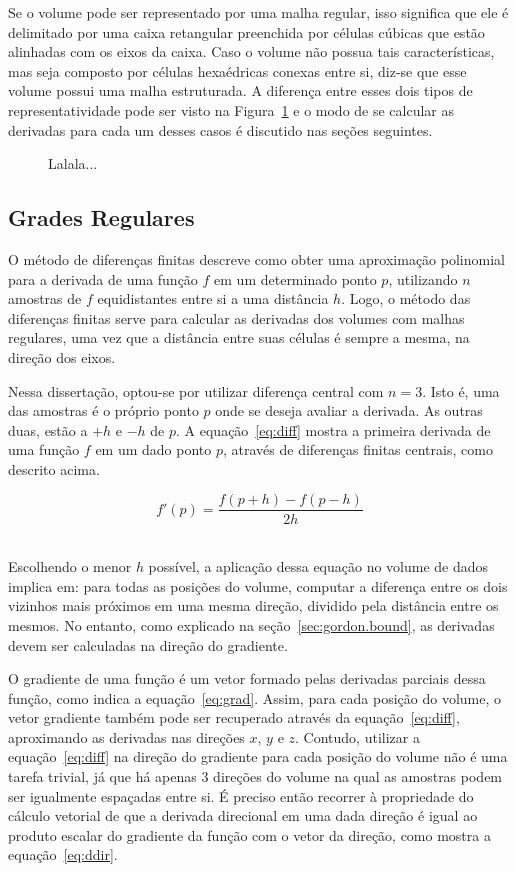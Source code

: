 	Se o volume pode ser representado por uma malha regular, isso significa que ele é delimitado por uma caixa retangular preenchida por células cúbicas que estão alinhadas com os eixos da caixa. Caso o volume não possua tais características, mas seja composto por células hexaédricas conexas entre si, diz-se que esse volume possui uma malha estruturada. A diferença entre esses dois tipos de representatividade pode ser visto na Figura~\ref{fig:meshes} e o modo de se calcular as derivadas para cada um desses casos é discutido nas seções seguintes.
	
\begin{figure}[h]
	\centering
	\label{fig:meshes}
	\caption{Lalala...}
\end{figure}
    
\subsection{Grades Regulares}
\label{subsec:my.struct}
	O método de diferenças finitas descreve como obter uma aproximação polinomial para a derivada de uma função $ f $ em um determinado ponto $ p $, utilizando $ n $ amostras de $ f $ equidistantes entre si a uma distância $ h $. Logo, o método das diferenças finitas serve para calcular as derivadas dos volumes com malhas regulares, uma vez que a distância entre suas células é sempre a mesma, na direção dos eixos.
	
	Nessa dissertação, optou-se por utilizar diferença central com $ n = 3 $. Isto é, uma das amostras é o próprio ponto $ p $ onde se deseja avaliar a derivada. As outras duas, estão a $ +h $ e $ -h $ de $ p $. A equação~\eqref{eq:diff} mostra a primeira derivada de uma função $ f $ em um dado ponto $ p $, através de diferenças finitas centrais, como descrito acima.
	
\begin{equation}\label{eq:diff}
	f'(p) = \frac{f(p + h) - f(p - h)}{2h}
\end{equation} \

	Escolhendo o menor $ h $ possível, a aplicação dessa equação no volume de dados implica em: para todas as posições do volume, computar a diferença entre os dois vizinhos mais próximos em uma mesma direção, dividido pela distância entre os mesmos. No entanto, como explicado na seção~\ref{sec:gordon.bound}, as derivadas devem ser calculadas na direção do gradiente.
	
	O gradiente de uma função é um vetor formado pelas derivadas parciais dessa função, como indica a equação~\eqref{eq:grad}. Assim, para cada posição do volume, o vetor gradiente também pode ser recuperado através da equação~\eqref{eq:diff}, aproximando as derivadas nas direções $ x $, $ y $ e $ z $. Contudo, utilizar a equação~\eqref{eq:diff} na direção do gradiente para cada posição do volume não é uma tarefa trivial, já que há apenas 3 direções do volume na qual as amostras podem ser igualmente espaçadas entre si. É preciso então recorrer à propriedade do cálculo vetorial de que a derivada direcional em uma dada direção é igual ao produto escalar do gradiente da função com o vetor da direção, como mostra a equação~\eqref{eq:ddir}.
	
